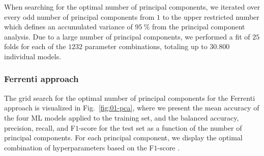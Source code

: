 \documentclass[superscriptaddress,unsortedaddress,
 amsmath,amssymb,
 aps,
]{revtex4-2}
\begin{document}
When searching for the optimal number of principal components, we iterated over every odd number of principal components from $1$ to the upper restricted number which defines an accumulated variance of $95 \ \%$ from the principal component analysis. Due to a large number of principal components, we performed a fit of  $25$ folds for each of the $1232$ parameter combinations, totaling up to $30.800$ individual models. 

\subsubsection*{Ferrenti approach}
The grid search for the optimal number of principal components for the Ferrenti approach is visualized in Fig.~\ref{fig:01-pca}, where we present the mean accuracy of the four ML models applied to the training set, and the balanced accuracy, precision, recall, and F$1$-score 
for the test set as a function of the number of principal components. For each principal component, we display the optimal combination of  hyperparameters based on the F$1$-score \cite{sammut2010,geron2022}.
\end{document}
